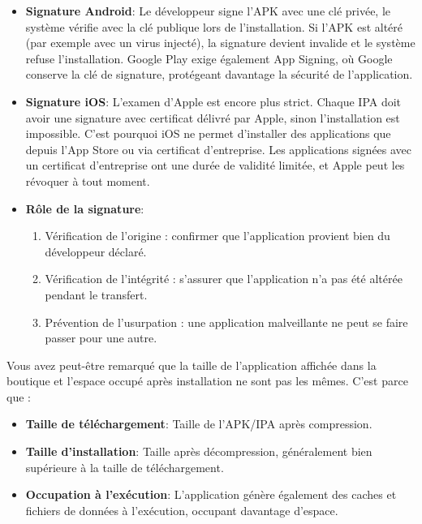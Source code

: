 \begin{itemize}
  \item \textbf{Signature Android}: Le développeur signe l'APK avec une clé privée, le système vérifie avec la clé publique lors de l'installation. Si l'APK est altéré (par exemple avec un virus injecté), la signature devient invalide et le système refuse l'installation. Google Play exige également App Signing, où Google conserve la clé de signature, protégeant davantage la sécurité de l'application.
  \item \textbf{Signature iOS}: L'examen d'Apple est encore plus strict. Chaque IPA doit avoir une signature avec certificat délivré par Apple, sinon l'installation est impossible. C'est pourquoi iOS ne permet d'installer des applications que depuis l'App Store ou via certificat d'entreprise. Les applications signées avec un certificat d'entreprise ont une durée de validité limitée, et Apple peut les révoquer à tout moment.
  \item \textbf{Rôle de la signature}:
  \begin{enumerate}
    \item Vérification de l'origine : confirmer que l'application provient bien du développeur déclaré.
    \item Vérification de l'intégrité : s'assurer que l'application n'a pas été altérée pendant le transfert.
    \item Prévention de l'usurpation : une application malveillante ne peut se faire passer pour une autre.
  \end{enumerate}
\end{itemize}


Vous avez peut-être remarqué que la taille de l'application affichée dans la boutique et l'espace occupé après installation ne sont pas les mêmes. C'est parce que :

\begin{itemize}
  \item \textbf{Taille de téléchargement}: Taille de l'APK/IPA après compression.
  \item \textbf{Taille d'installation}: Taille après décompression, généralement bien supérieure à la taille de téléchargement.
  \item \textbf{Occupation à l'exécution}: L'application génère également des caches et fichiers de données à l'exécution, occupant davantage d'espace.
\end{itemize}

